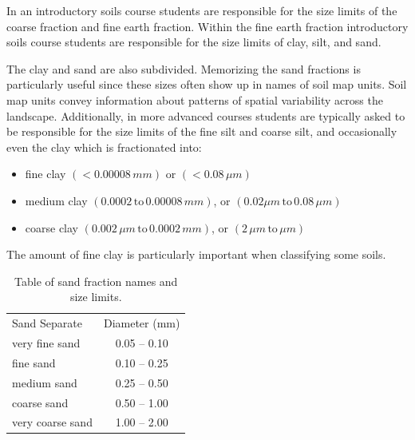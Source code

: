 \documentclass{book}
\begin{document}
In an introductory soils course students are responsible for the size limits of the coarse fraction and fine earth fraction. Within the fine earth fraction introductory soils course students are responsible for the size limits of clay, silt, and sand.

The clay and sand are also subdivided. Memorizing the sand fractions is particularly useful since these sizes often show up in names of soil map units. Soil map units convey information about patterns of spatial variability across the landscape. Additionally, in more advanced courses students are typically asked to be responsible for the size limits of the fine silt and coarse silt, and occasionally even the clay which is fractionated into:
    
\begin{itemize}
    \item fine clay $\left( < 0.00008\, mm \right)$ or $\left( < 0.08\, \mu m \right)$
    \item medium clay $\left(0.0002\, \text{to}\, 0.00008\, mm \right)$, or $\left(0.02 \mu m\,\text{to}\,0.08\, \mu m \right)$
    \item coarse clay $\left(0.002\, \mu m\, \text{to}\, 0.0002\, mm\right)$, or $\left(2\, \mu m\,\text{to}\,\mu m \right)$
\end{itemize}
    
The amount of fine clay is particularly important when classifying some soils.
    
\begin{table}[!htbp]
\centering
\caption{Table of sand fraction names and size limits.}
\label{tab:sandfractions}
\begin{tabular}{|lc|}
\hline
Sand Separate    & Diameter (mm) \\ \hhline{|==|}
very fine sand   & 0.05 – 0.10   \\
fine sand        & 0.10 – 0.25   \\
medium sand      & 0.25 – 0.50   \\
coarse sand      & 0.50 – 1.00   \\
very coarse sand & 1.00 – 2.00   \\
\hline
\end{tabular}
\end{table}

    
\end{document}
